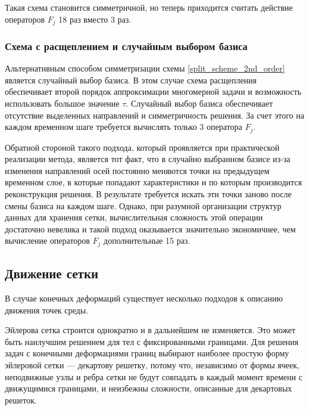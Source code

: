 Такая схема становится симметричной, но теперь приходится считать действие операторов $F_j$ 18 раз вместо 3 раз.


\subsubsection{Схема с расщеплением и случайным выбором базиса}

Альтернативным способом симметризации схемы \ref{split_scheme_2nd_order} является случайный выбор базиса. В этом случае схема расщепления обеспечивает второй порядок аппроксимации многомерной задачи и возможность использовать большое значение $\tau$. Случайный выбор базиса обеспечивает отсутствие выделенных направлений и симметричность решения. За счет этого на каждом временном шаге требуется вычислять только 3 оператора $F_j$.

Обратной стороной такого подхода, который проявляется при практической реализации метода, является тот факт, что в случайно выбранном базисе из-за изменения направлений осей постоянно меняются точки на предыдущем временном слое, в которые попадают характеристики и по которым производится реконструкция решения. В результате требуется искать эти точки заново после смены базиса на каждом шаге. Однако, при разумной организации структур данных для хранения сетки, вычислительная сложность этой операции достаточно невелика и такой подход оказывается значительно экономичнее, чем вычисление операторов $F_j$ дополнительные 15 раз.

\clearpage
\newpage

\subsection{Движение сетки}


В случае конечных деформаций существует несколько подходов к описанию движения точек среды.

Эйлерова сетка строится однократно и в дальнейшем не изменяется. Это может быть наилучшим решением для тел с фиксированными границами. Для решения задач с конечными деформациями границ выбирают наиболее простую форму эйлеровой сетки — декартову решетку, потому что, независимо от формы ячеек, неподвижные узлы и ребра сетки не будут совпадать в каждый момент времени с движущимися границами, и неизбежны сложности, описанные для декартовых решеток.


